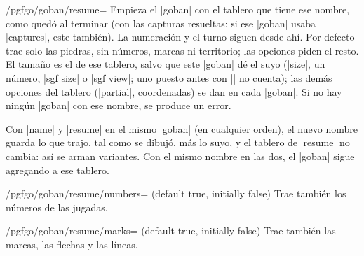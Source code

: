 	\begin{key}{/pgfgo/goban/resume=}
		Empieza el |goban| con el tablero que tiene ese nombre, como quedó al terminar (con las capturas resueltas: si ese |goban| usaba |captures|, este también). La numeración y el turno siguen desde ahí. Por defecto trae solo las piedras, sin números, marcas ni territorio; las opciones piden el resto. El tamaño es el de ese tablero, salvo que este |goban| dé el suyo (|size|, un número, |sgf size| o |sgf view|; uno puesto antes con |\pgfgoset| no cuenta); las demás opciones del tablero (|partial|, coordenadas) se dan en cada |goban|. Si no hay ningún |goban| con ese nombre, se produce un error.

		Con |name| y |resume| en el mismo |goban| (en cualquier orden), el nuevo nombre guarda lo que trajo, tal como se dibujó, más lo suyo, y el tablero de |resume| no cambia: así se arman variantes. Con el mismo nombre en las dos, el |goban| sigue agregando a ese tablero.

		\begin{codeexample}[]

			\begin{goban}[name = base]
			\end{goban}

			\begin{goban}[name = variante1, resume = base]
			\end{goban}

			\begin{goban}[name = variante2, resume = base]
			\end{goban}

			\begin{goban}[resume = {variante1, numbers}]
			\end{goban}
		\end{codeexample}
	\end{key}

	\begin{key}{/pgfgo/goban/resume/numbers= (default true, initially false)}
		Trae también los números de las jugadas.
	\end{key}

	\begin{key}{/pgfgo/goban/resume/marks= (default true, initially false)}
		Trae también las marcas, las flechas y las líneas.
	\end{key}

